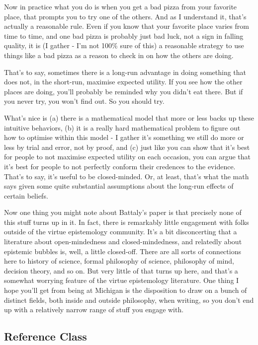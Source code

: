 \documentclass[
]{article}
\begin{document}
Now in practice what you do is when you get a bad pizza from your
favorite place, that prompts you to try one of the others. And as I
understand it, that's actually a reasonable rule. Even if you know that
your favorite place varies from time to time, and one bad pizza is
probably just bad luck, not a sign in falling quality, it is (I gather -
I'm not 100\% sure of this) a reasonable strategy to use things like a
bad pizza as a reason to check in on how the others are doing.

That's to say, sometimes there is a long-run advantage in doing
something that does not, in the short-run, maximise expected utility. If
you see how the other places are doing, you'll probably be reminded why
you didn't eat there. But if you never try, you won't find out. So you
should try.

What's nice is (a) there is a mathematical model that more or less backs
up these intuitive behaviors, (b) it is a really hard mathematical
problem to figure out how to optimise within this model - I gather it's
something we still do more or less by trial and error, not by proof, and
(c) just like you can show that it's best for people to not maximise
expected utility on each occasion, you can argue that it's best for
people to not perfectly conform their credences to the evidence. That's
to say, it's useful to be closed-minded. Or, at least, that's what the
math says given some quite substantial assumptions about the long-run
effects of certain beliefs.

Now one thing you might note about Battaly's paper is that precisely
none of this stuff turns up in it. In fact, there is remarkably little
engagement with folks outside of the virtue epistemology community. It's
a bit disconcerting that a literature about open-mindedness and
closed-mindedness, and relatedly about epistemic bubbles is, well, a
little closed-off. There are all sorts of connections here to history of
science, formal philosophy of science, philosophy of mind, decision
theory, and so on. But very little of that turns up here, and that's a
somewhat worrying feature of the virtue epistemology literature. One
thing I hope you'll get from being at Michigan is the disposition to
draw on a bunch of distinct fields, both inside and outside philosophy,
when writing, so you don't end up with a relatively narrow range of
stuff you engage with.

\hypertarget{reference-class}{%
\subsection{Reference Class}\label{reference-class}}
\end{document}

